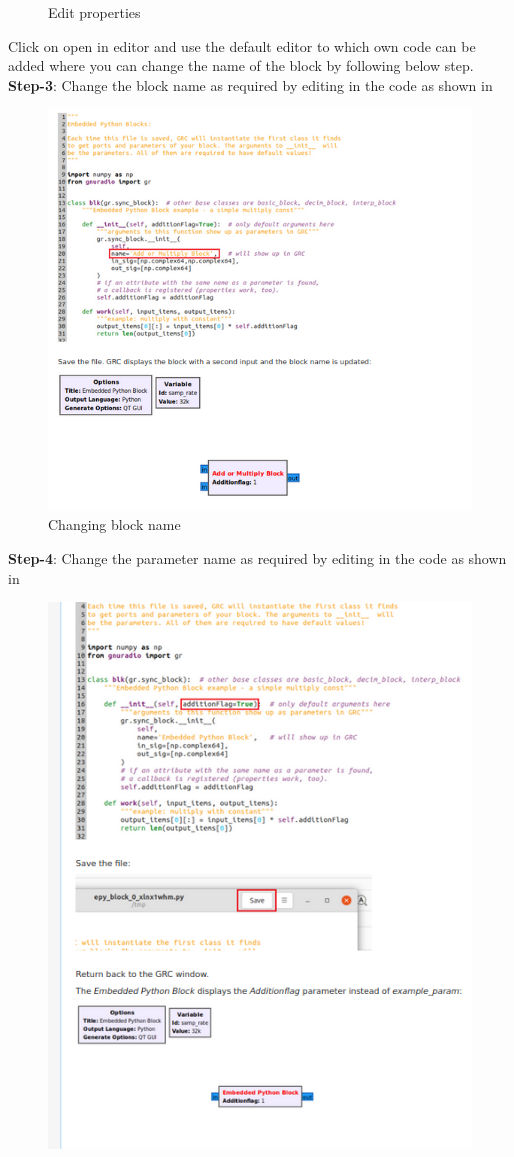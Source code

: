 \begin{enumerate}[label=\arabic*.,ref=\thesection.\theenumi]
\begin{figure}[H]
\caption{Edit properties}
\label{fig:Edit properties}
\end{figure}
Click on open in editor and use the default editor to which own code can be added where you can change the name of the block by following below step.\\
\textbf{Step-3}:
Change the block name as required by editing in the code as shown in                                                
\begin{figure}[H]
\centering
\includegraphics[width=\columnwidth]{fm/rx/figs/step_3.png}
\caption{Changing block name}
\label{fig:changing block name}
\end{figure}
\textbf{Step-4}:
Change the parameter name as required by editing in the code as shown in                                                
\begin{figure}[H]
\centering
\includegraphics[width=0.7\columnwidth]{fm/rx/figs/step_4.png}

\end{figure}
\end{enumerate}
